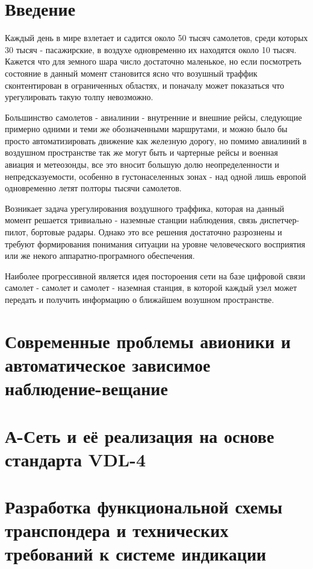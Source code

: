 \documentclass[a4paper,12pt]{report} %
\begin{document}
\tableofcontents

\setlength{\parskip}{1em}
\section{Введение} %

Каждый день в мире взлетает и садится около 50 тысяч самолетов, среди
которых 30 тысяч - пасажирские, в воздухе одновременно их находятся около 10
тысяч. Кажется что для земного шара число достаточно маленькое, но если
посмотреть состояние в данный момент становится ясно что возушный траффик
сконтентирован в ограниченных областях, и поначалу может показаться что
урегулировать такую толпу невозможно.

Большинство самолетов - авиалинии - внутренние и внешние рейсы, следующие
примерно одними и теми же обозначенными маршрутами, и можно было бы просто
автоматизировать движение как железную дорогу, но помимо авиалиний в воздушном
пространстве так же могут быть и чартерные рейсы и военная авиация и метеозонды,
все это вносит большую долю неопределенности и непредсказуемости, особенно в
густонаселенных зонах - над одной лишь европой одновременно летят полторы тысячи
самолетов.

Возникает задача урегулирования воздушного траффика, которая на данный момент
решается тривиально - наземные станции наблюдения, связь диспетчер-пилот,
бортовые радары. Однако это все решения достаточно разрознены и требуют
формирования понимания ситуации на уровне человеческого восприятия или же некого
аппаратно-програмного обеспечения.

Наиболее прогрессивной является идея постороения сети на базе цифровой связи
самолет - самолет и самолет - наземная станция, в которой каждый узел может
передать и получить информацию о ближайшем возушном пространстве.
\newpage
\section{Современные проблемы авионики и автоматическое зависимое
  наблюдение-вещание} %

\lipsum [2-3]
\section{А-Сеть и её реализация на основе стандарта VDL-4} %
\lipsum [4-5]
\section{Разработка функциональной схемы транспондера и технических требований к
  системе индикации} %
\lipsum [6]
\end{document}

